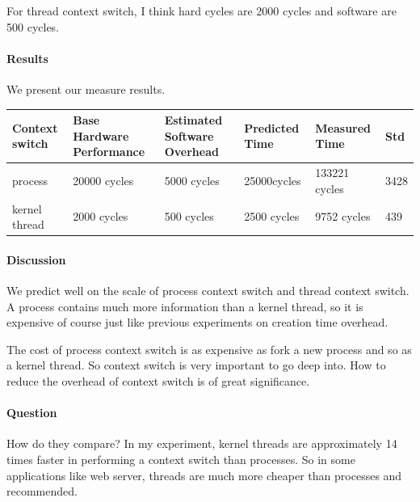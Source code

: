 For thread context switch, I think hard cycles are 2000 cycles and software are 500 cycles.

\paragraph{Results}
We present our measure results.

\begin{center}
\begin{tabular}{| p{2cm} | p{3cm} | p{3cm} | p{2.5cm} | p{2.5cm} | p{2cm} }
Context switch              & Base Hardware Performance  & Estimated Software Overhead  & Predicted Time  & Measured Time & Std  \\
\hline
process & 20000 cycles& 5000 cycles& 25000cycles & 133221 cycles & 3428 \\
kernel thread    & 2000 cycles& 500 cycles& 2500 cycles& 9752 cycles & 439 \\
\end{tabular}
\end{center}

\paragraph{Discussion}
We predict well on the scale of process context switch and thread context switch. A process contains much more information than a kernel thread, so it is expensive of course just like previous experiments on creation time overhead.

The cost of process context switch is as expensive as fork a new process and so as a kernel thread. So context switch is very important to go deep into. How to reduce the overhead of context switch is of great significance.

\paragraph{Question} How do they compare?
In my experiment, kernel threads are approximately 14 times faster in performing a context switch than processes. So in some applications like web server, threads are much more cheaper than processes and recommended.